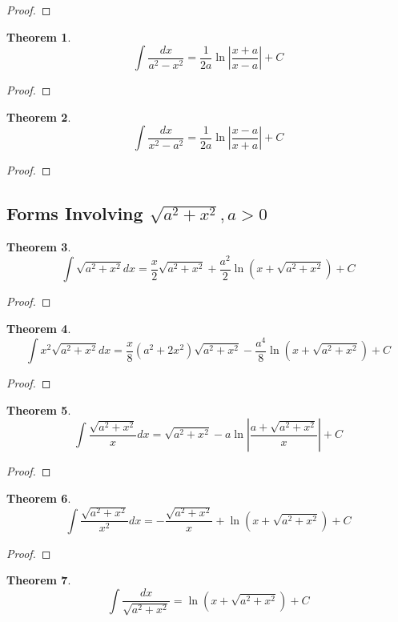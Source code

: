 \documentclass[10pt]{report}
\newtheorem{thm3}{Theorem}[subsection]
\begin{document}
\begin{proof}

\end{proof}
\begin{thm3}
$$\int \frac{dx}{a^2-x^2}=\frac{1}{2a}\ln\left|\frac{x+a}{x-a}\right|+C$$
\end{thm3}
\begin{proof}

\end{proof}
\begin{thm3}
$$\int \frac{dx}{x^2-a^2}=\frac{1}{2a}\ln\left|\frac{x-a}{x+a}\right|+C$$
\end{thm3}
\begin{proof}

\end{proof}
\subsection{Forms Involving $\sqrt{a^2 + x^2}, a>0$}
\begin{thm3}
$$\int \sqrt{a^2 + x^2}dx = \frac{x}{2}\sqrt{a^2 + x^2} + \frac{a^2}{2}\ln (x + \sqrt{a^2 + x^2})+C$$
\end{thm3}
\begin{proof}

\end{proof}
\begin{thm3}
$$\int x^2\sqrt{a^2 + x^2}dx = \frac{x}{8}(a^2 + 2x^2)\sqrt{a^2 + x^2} - \frac{a^4}{8}\ln(x + \sqrt{a^2 + x^2}) + C$$
\end{thm3}
\begin{proof}

\end{proof}
\begin{thm3}
$$\int \frac{\sqrt{a^2 + x^2}}{x}dx = \sqrt{a^2 + x^2}-a\ln\left |\frac{a + \sqrt{a^2 + x^2}}{x}\right | +C$$
\end{thm3}
\begin{proof}

\end{proof}
\begin{thm3}
$$\int \frac{\sqrt{a^2 + x^2}}{x^2}dx = -\frac{\sqrt{a^2 + x^2}}{x} + \ln(x + \sqrt{a^2 + x^2})+C$$
\end{thm3}
\begin{proof}

\end{proof}
\begin{thm3}
$$\int \frac{dx}{\sqrt{a^2 + x^2}}=\ln(x + \sqrt{a^2 + x^2})+C$$
\end{thm3}
\end{document}
